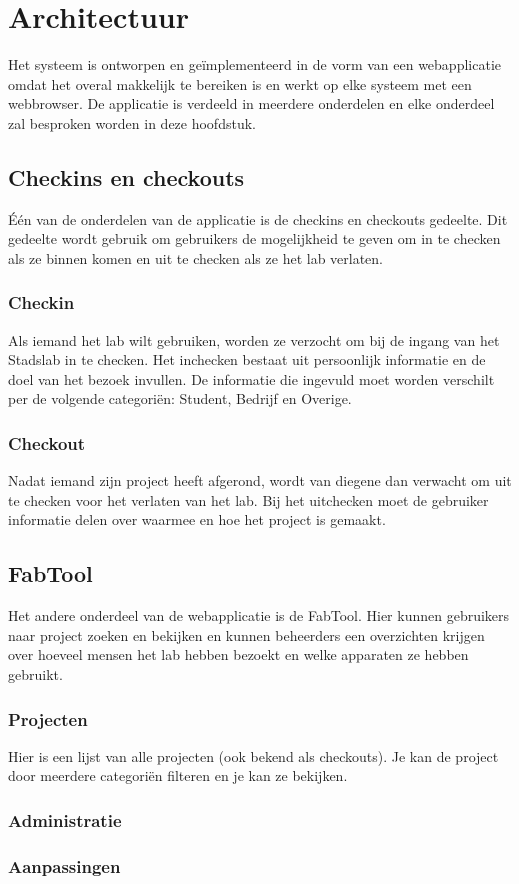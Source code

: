 \chapter{Architectuur}

Het systeem is ontworpen en ge\"implementeerd in de vorm van een webapplicatie omdat het overal makkelijk te bereiken is en werkt op elke systeem met een webbrowser. De applicatie is verdeeld in meerdere onderdelen en elke onderdeel zal besproken worden in deze hoofdstuk.

\section{Checkins en checkouts}

\'E\'en van de onderdelen van de applicatie is de checkins en checkouts gedeelte. Dit gedeelte wordt gebruik om gebruikers de mogelijkheid te geven om in te checken als ze binnen komen en uit te checken als ze het lab verlaten.

\subsection{Checkin}

Als iemand het lab wilt gebruiken, worden ze verzocht om bij de ingang van het Stadslab in te checken. Het inchecken bestaat uit persoonlijk informatie en de doel van het bezoek invullen. De informatie die ingevuld moet worden verschilt per de volgende categori\"en: Student, Bedrijf en Overige.

\subsection{Checkout}

Nadat iemand zijn project heeft afgerond, wordt van diegene dan verwacht om uit te checken voor het verlaten van het lab. Bij het uitchecken moet de gebruiker informatie delen over waarmee en hoe het project is gemaakt.

\section{FabTool}

Het andere onderdeel van de webapplicatie is de FabTool. Hier kunnen gebruikers naar project zoeken en bekijken en kunnen beheerders een overzichten krijgen over hoeveel mensen het lab hebben bezoekt en welke apparaten ze hebben gebruikt.

\subsection{Projecten}

Hier is een lijst van alle projecten (ook bekend als checkouts). Je kan de project door meerdere categori\"en filteren en je kan ze bekijken.

\subsection{Administratie}

\subsection{Aanpassingen}